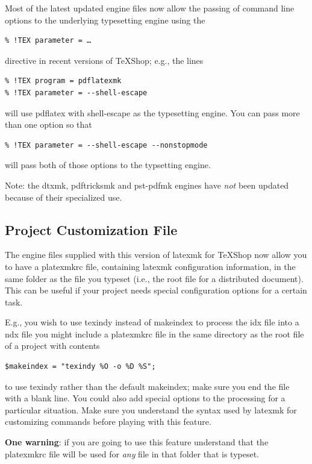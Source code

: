 \documentclass[11pt]{article}
\newcommand{\cmd}[1]{\textsf{#1}}
\newcommand{\TS}{\textsf{\TeX Shop}}
\begin{document}
Most of the latest updated engine files now allow the passing of command line options to the underlying typesetting engine using the 
\begin{verbatim}
% !TEX parameter = …
\end{verbatim}
directive in recent versions of \TS; e.g., the lines
\begin{verbatim}
% !TEX program = pdflatexmk
% !TEX parameter = --shell-escape
\end{verbatim}
will use \cmd{pdflatex} with \cmd{shell-escape} as the typesetting engine. You can pass more than one option so that
\begin{verbatim}
% !TEX parameter = --shell-escape --nonstopmode
\end{verbatim}
will pass both of those options to the typsetting engine.

Note: the \cmd{dtxmk}, \cmd{pdftricksmk} and \cmd{pst-pdfmk} engines have \emph{not} been updated because of their specialized use.

\subsection{Project Customization File}

The engine files supplied with this version of latexmk for TeXShop now allow you to have a \cmd{platexmkrc} file, containing \cmd{latexmk} configuration information, in the same folder as the file you typeset (i.e., the root file for a distributed document). This can be useful if your project needs special configuration options for a certain task.

E.g., you wish to use \cmd{texindy} instead of \cmd{makeindex} to process the \cmd{idx} file into a \cmd{ndx} file you might include a \cmd{platexmkrc} file in the same directory as the root file of a project with contents
\begin{verbatim}
$makeindex = "texindy %O -o %D %S";
\end{verbatim}
to use \cmd{texindy} rather than the default \cmd{makeindex}; make sure you end the file with a blank line. You could also add special options to the processing for a particular situation. Make sure you understand the syntax used by \cmd{latexmk} for customizing commands before playing with this feature.

\textbf{One warning}: if you are going to use this feature understand that the \cmd{platexmkrc} file will be used for \emph{any} file in that folder that is typeset.
\end{document}
